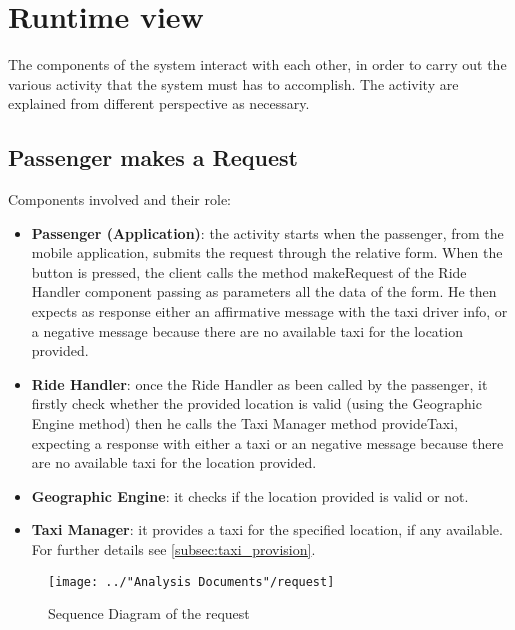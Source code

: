 \section{Runtime view}
The components of the system interact with each other, in order to carry out the various activity that the system must has to accomplish.
The activity are explained from different perspective as necessary.

\subsection{Passenger makes a Request} \label{seq:passengerMakesRequest}
Components involved and their role:
\begin{itemize}
	\item \textbf{Passenger (Application)}: the activity starts when the passenger, from the mobile application, submits the request through the relative form. When the button is pressed, the client calls the method makeRequest of the Ride Handler component passing as parameters all the data of the form. He then expects as response either an affirmative message with the taxi driver info, or a negative message because there are no available taxi for the location provided.
	\item \textbf{Ride Handler}: once the Ride Handler as been called by the passenger, it firstly check whether the provided location is valid (using the Geographic Engine method) then he calls the Taxi Manager method provideTaxi, expecting a response with either a taxi or an negative message because there are no available taxi for the location provided.
	\item \textbf{Geographic Engine}: it checks if the location provided is valid or not.
	\item \textbf{Taxi Manager}: it provides a taxi for the specified location, if any available. For further details see \ref{subsec:taxi_provision}.
\end{itemize}
\begin{figure}[H]
	\centering
	\texttt{[image: ../"Analysis Documents"/request]}
	\label{fig:request_seq}
	\caption{Sequence Diagram of the request}
\end{figure}

